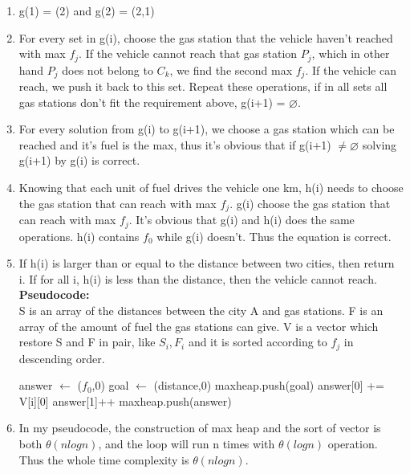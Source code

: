 \begin{solution}
    \begin{enumerate}
        \item g(1) = {(2)} and g(2) = {(2,1)}
        \item For every set in g(i), choose the gas station that the vehicle haven't reached with max $f_j$.
              If the vehicle cannot reach that gas station $P_j$, which in other hand $P_j$ does not belong to $C_k$, we find the second max $f_j$.
              If the vehicle can reach, we push it back to this set.
              Repeat these operations, if in all sets all gas stations don't fit the requirement above, g(i+1) = $\varnothing$.
        \item For every solution from g(i) to g(i+1), we choose a gas station which can be reached and it's fuel is the max, thus it's obvious that if g(i+1) $\ne \varnothing$ solving g(i+1) by g(i) is correct.
        \item Knowing that each unit of fuel drives the vehicle one km, h(i) needs to choose the gas station that can reach with max $f_j$.
              g(i) choose the gas station that can reach with max $f_j$. It's obvious that g(i) and h(i) does the same operations.
              h(i) contains $f_0$ while g(i) doesn't. Thus the equation is correct.
        \item If h(i) is larger than or equal to the distance between two cities, then return i.
              If for all i, h(i) is less than the distance, then the vehicle cannot reach.
              \newpage
              \textbf{Pseudocode:}\\
              S is an array of the distances between the city A and gas stations.
              F is an array of the amount of fuel the gas stations can give.
              V is a vector which restore S and F in pair, like {$S_i,F_i$} and it is sorted according to $f_j$ in descending order.
              \begin{algorithm}[H]
                  \color{blue}
                  \begin{algorithmic}[1]
                      \State answer $\gets$ ($f_0$,0)
                      \State goal $\gets$ (distance,0)
                      \State maxheap.push(goal)
                      \State answer[0] += V[i][0]
                      \State answer[1]++
                      \EndIf
                      \State maxheap.push(answer)
                      \Return
                      \EndIf
                      \EndFor
                      \EndFunction
                  \end{algorithmic}
              \end{algorithm}
        \item In my pseudocode, the construction of max heap and the sort of vector is both $\theta(nlogn)$, and the loop will  run n times with $\theta(logn)$ operation.
              Thus the whole time complexity is $\theta(nlogn)$.
    \end{enumerate}
\end{solution}
